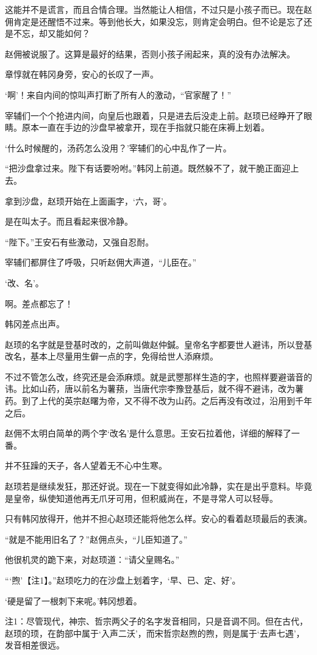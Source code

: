 这能并不是谎言，而且合情合理。当然能让人相信，不过只是小孩子而已。现在赵佣肯定是还醒悟不过来。等到他长大，如果没忘，则肯定会明白。但不论是忘了还是不忘，却又能如何？

赵佣被说服了。这算是最好的结果，否则小孩子闹起来，真的没有办法解决。

章惇就在韩冈身旁，安心的长叹了一声。

‘啊’！来自内间的惊叫声打断了所有人的激动，“官家醒了！”

宰辅们一个个抢进内间，向皇后也跟着，只是进去后没走上前。赵顼已经睁开了眼睛。原本一直在手边的沙盘早被拿开，现在手指就只能在床褥上划着。

‘什么时候醒的，汤药怎么没用？’宰辅们的心中乱作了一片。

“把沙盘拿过来。陛下有话要吩咐。”韩冈上前道。既然躲不了，就干脆正面迎上去。

拿到沙盘，赵顼开始在上面画字，‘六，哥’。

是在叫太子。而且看起来很冷静。

“陛下。”王安石有些激动，又强自忍耐。

宰辅们都屏住了呼吸，只听赵佣大声道，“儿臣在。”

‘改、名’。

啊。差点都忘了！

韩冈差点出声。

赵顼的名字就是登基时改的，之前叫做赵仲鍼。皇帝名字都要世人避讳，所以登基改名，基本上尽量用生僻一点的字，免得给世人添麻烦。

不过不管怎么改，终究还是会添麻烦。就是武瞾那样生造的字，也照样要避谐音的讳。比如山药，唐以前名为薯蓣，当唐代宗李豫登基后，就不得不避讳，改为薯药。到了上代的英宗赵曙为帝，又不得不改为山药。之后再没有改过，沿用到千年之后。

赵佣不太明白简单的两个字‘改名’是什么意思。王安石拉着他，详细的解释了一番。

并不狂躁的天子，各人望着无不心中生寒。

赵顼若是继续发狂，那还好说。现在一下就变得如此冷静，实在是出乎意料。毕竟是皇帝，纵使知道他再无爪牙可用，但积威尚在，不是寻常人可以轻辱。

只有韩冈放得开，他并不担心赵顼还能将他怎么样。安心的看着赵顼最后的表演。

“就是不能用旧名了？”赵佣点头，“儿臣知道了。”

他很机灵的跪下来，对赵顼道：“请父皇赐名。”

“‘煦’【注1】。”赵顼吃力的在沙盘上划着字，‘早、已、定、好’。

‘硬是留了一根刺下来呢。’韩冈想着。

注1：尽管现代，神宗、哲宗两父子的名字发音相同，只是音调不同。但在古代，赵顼的顼，在韵部中属于‘入声二沃’，而宋哲宗赵煦的煦，则是属于‘去声七遇’，发音相差很远。

